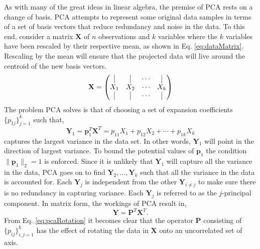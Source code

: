 As with many of the great ideas in linear algebra, the premise of \ac{PCA} rests on a change of basis. \ac{PCA} attempts to represent some original data samples in terms of a set of basis vectors that reduce redundancy and noise in the data. To this end, consider a matrix $\textbf{X}$ of $n$ observations and $k$ variables where the $k$ variables have been rescaled by their respective mean, as shown in Eq. \ref{eq:dataMatrix}. Rescaling by the mean will ensure that the projected data will live around the centroid of the new basis vectors.
\begin{equation}
\label{eq:dataMatrix}
 \textbf{X} =
  \begin{pmatrix}
   \vline & \vline & \cdots & \vline \\ 
   X_{1} & X_{2} & \cdots & X_{k} \\
   \vline & \vline & \cdots & \vline 
  \end{pmatrix}
\end{equation} 
The problem \ac{PCA} solves is that of choosing a set of expansion coefficients $\lbrace p_{1j}\rbrace_{j=1}^k$ such that,
\begin{equation}
\label{eq:pcaExpCoeffs}
 \textbf{Y}_{1} = \textbf{p}_{1}^{T}\textbf{X}^{T} = p_{11}X_{1} + p_{12}X_{2} + \cdots + p_{1k}X_{k}
\end{equation}
captures the largest variance in the data set. In other words, $\textbf{Y}_{1}$ will point in the direction of largest variance. To bound the potential values of $\textbf{p}_{1}$ the condition $\| \textbf{p}_{1} \|_2 = 1$ is enforced. Since it is unlikely that $\textbf{Y}_{1}$ will capture all the variance in the data, \ac{PCA} goes on to find $\textbf{Y}_{2}, ..., \textbf{Y}_{k}$ such that all the variance in the data is accounted for. Each $\textbf{Y}_{j}$ is independent from the other $\textbf{Y}_{i\not= j}$ to make sure there is no redundancy in capturing variance. Each $\textbf{Y}_{j}$ is referred to as the $j$-principal component. In matrix form, the workings of \ac{PCA} result in,
\begin{equation}
\label{eq:pcaRotation}
 \textbf{Y} = \textbf{P}^T\textbf{X}^T.
\end{equation}
From Eq. \ref{eq:pcaRotation} it becomes clear that the operator $\textbf{P}$ consisting of $\lbrace p_{ij}\rbrace_{i,j=1}^k$ has the effect of rotating the data in $\textbf{X}$ onto an uncorrelated set of axis. 

